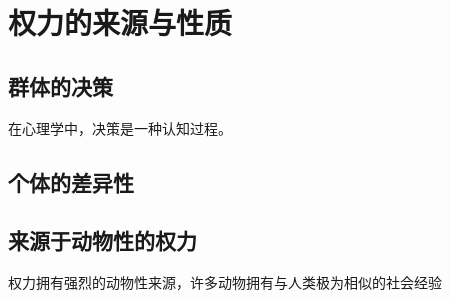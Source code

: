 \documentclass[main.tex]{subfiles}
\begin{document}
\chapter{权力的来源与性质}
\section{群体的决策}
在心理学中，决策是一种认知过程。

\section{个体的差异性}

\section{来源于动物性的权力}
权力拥有强烈的动物性来源，许多动物拥有与人类极为相似的社会经验
\end{document}
